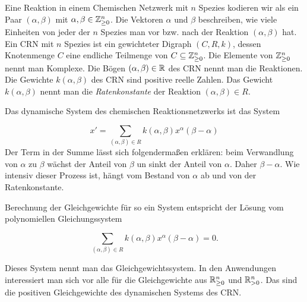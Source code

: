 \documentclass[11pt]{article}
\numberwithin{equation}{section}
\begin{document}
Eine Reaktion in einem Chemischen Netzwerk mit $n$ Spezies kodieren wir als ein Paar $(\alpha,\beta)$ mit $\alpha,\beta \in \mathbb{Z}_{\ge 0}^n$. Die Vektoren $\alpha$ und $\beta$ beschreiben, wie viele Einheiten von jeder der $n$ Spezies man vor bzw. nach der Reaktion $(\alpha,\beta)$ hat. Ein CRN mit $n$ Spezies  ist ein gewichteter Digraph $ (C,R,k)$, dessen Knotenmenge $C$ eine endliche Teilmenge von $C \subseteq \mathbb{Z}_{\ge 0}^n$. Die Elemente von $\mathbb{Z}_{\ge 0}^n$ nennt man Komplexe. Die Bögen $(\alpha,\beta) \in \mathbb{R}$ des CRN nennt man die Reaktionen. Die Gewichte $k(\alpha,\beta)$ des CRN sind positive reelle Zahlen. Das Gewicht $k(\alpha, \beta)$ nennt man  die \emph{Ratenkonstante} der Reaktion $(\alpha,\beta) \in R$. 

Das dynamische System des chemischen Reaktionsnetzwerks ist das System 

\[
	x' = \sum_{ (\alpha,\beta) \in R } k(\alpha,\beta) x^\alpha (\beta-\alpha)
\]
Der Term in der Summe lässt sich folgendermaßen erklären: beim Verwandlung von $\alpha$ zu $\beta$ wächst der Anteil von $\beta$ un sinkt der Anteil von $\alpha$. Daher $\beta - \alpha$. Wie intensiv dieser Prozess ist, hängt vom Bestand von $\alpha$ ab und von der Ratenkonstante. 

Berechnung der Gleichgewichte für so ein System entspricht der Lösung vom polynomiellen Gleichungssystem

\[
	\sum_{ (\alpha,\beta) \in R } k(\alpha,\beta) x^\alpha (\beta-\alpha) = 0. 
\]

Dieses System nennt man das Gleichgewichtssystem. In den Anwendungen interessiert man sich vor alle für die Gleichgewichte aus $\mathbb{R}_{\ge 0}^n$ und $\mathbb{R}_{>0}^n$. Das sind die positiven Gleichgewichte des dynamischen Systems des CRN. 
\end{document}
